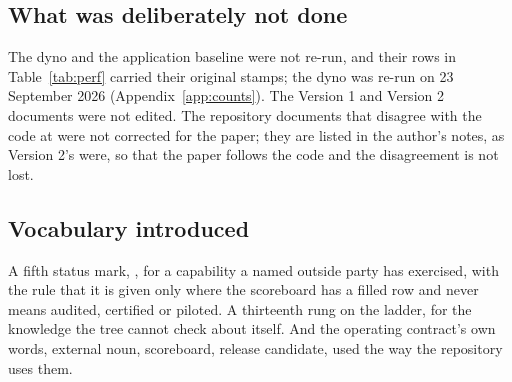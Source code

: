 \subsection*{What was deliberately not done}

The dyno and the application baseline were not re-run, and their rows in Table~\ref{tab:perf}
carried their original stamps; the dyno was re-run on 23 September 2026 (Appendix~\ref{app:counts}). The Version 1 and Version 2 documents were not edited. The repository
documents that disagree with the code at  were not corrected for the paper; they
are listed in the author's notes, as Version 2's were, so that the paper follows the code and the
disagreement is not lost.

\subsection*{Vocabulary introduced}

A fifth status mark, \sWit, for a capability a named outside party has exercised, with the rule
that it is given only where the scoreboard has a filled row and never means audited, certified or
piloted. A thirteenth rung on the ladder, for the knowledge the tree cannot check about itself. And
the operating contract's own words, external noun, scoreboard, release candidate, used the way the
repository uses them.
